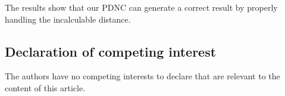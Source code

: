\documentclass{CVM}
\begin{document}
The results show that our PDNC can generate a correct result by properly handling the incalculable distance.







\subsection*{Declaration of competing interest}
The authors have no competing interests to declare that are relevant to the content of this article.





\end{document}
